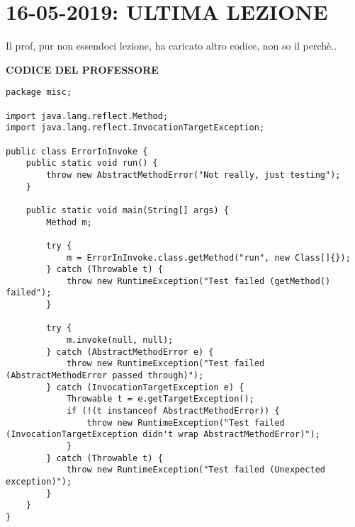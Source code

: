 \newpage
\section{16-05-2019: ULTIMA LEZIONE}
\noindent Il prof, pur non essendoci lezione, ha caricato altro codice, non so il perchè.. \newline

\noindent \textbf{CODICE DEL PROFESSORE} \newline


\begin{lstlisting}
package misc;

import java.lang.reflect.Method;
import java.lang.reflect.InvocationTargetException;

public class ErrorInInvoke {
    public static void run() {
        throw new AbstractMethodError("Not really, just testing");
    }

    public static void main(String[] args) {
        Method m;

        try {
            m = ErrorInInvoke.class.getMethod("run", new Class[]{});
        } catch (Throwable t) {
            throw new RuntimeException("Test failed (getMethod() failed");
        }

        try {
            m.invoke(null, null);
        } catch (AbstractMethodError e) {
            throw new RuntimeException("Test failed (AbstractMethodError passed through)");
        } catch (InvocationTargetException e) {
            Throwable t = e.getTargetException();
            if (!(t instanceof AbstractMethodError)) {
                throw new RuntimeException("Test failed (InvocationTargetException didn't wrap AbstractMethodError)");
            }
        } catch (Throwable t) {
            throw new RuntimeException("Test failed (Unexpected exception)");
        }
    }
}
\end{lstlisting}


